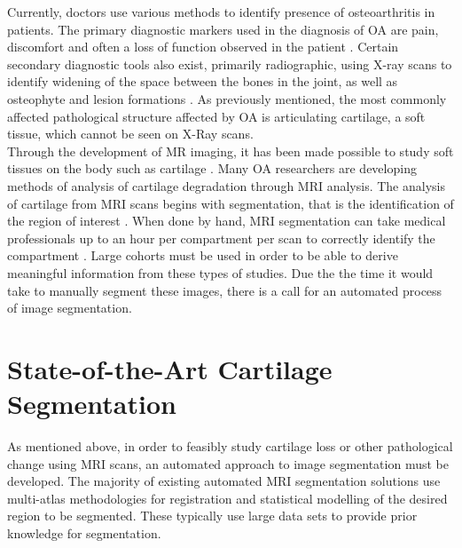 \documentclass[11pt,a4paper]{memoir}
\numberwithin{figure}{section}
\numberwithin{table}{section}
\numberwithin{equation}{section}
\begin{document}
Currently, doctors use various methods to identify presence of osteoarthritis in patients. The primary diagnostic markers used in the diagnosis of OA are pain, discomfort and often a loss of function observed in the patient \cite{Zhang2010EpidemiologyOsteoarthritis.}. Certain secondary diagnostic tools also exist, primarily radiographic, using X-ray scans to identify widening of the space between the bones in the joint, as well as osteophyte and lesion formations \cite{Yusuf2011}. As previously mentioned, the most commonly affected pathological structure affected by OA is articulating cartilage, a soft tissue, which cannot be seen on X-Ray scans.\\

Through the development of MR imaging, it has been made possible to study soft tissues on the body such as cartilage \cite{Dhawan2010b}.  Many OA researchers are developing methods of analysis of cartilage degradation through MRI analysis. The analysis of cartilage from MRI scans begins with segmentation, that is the identification of the region of interest \cite{Dhawan2010c}. When done by hand, MRI segmentation can take medical professionals up to an hour per compartment per scan to correctly identify the compartment . Large cohorts must be used in order to be able to derive meaningful information from these types of studies. Due the the time it would take to manually segment these images, there is a call for an automated process of image segmentation.  \\


\section{State-of-the-Art Cartilage Segmentation}
As mentioned above, in order to feasibly study cartilage loss or other pathological change using MRI scans, an automated approach to image segmentation must be developed. The majority of existing automated MRI segmentation solutions use multi-atlas methodologies for registration and statistical modelling of the desired region to be segmented. These typically use large data sets to provide prior knowledge for segmentation.  \\
\end{document}
